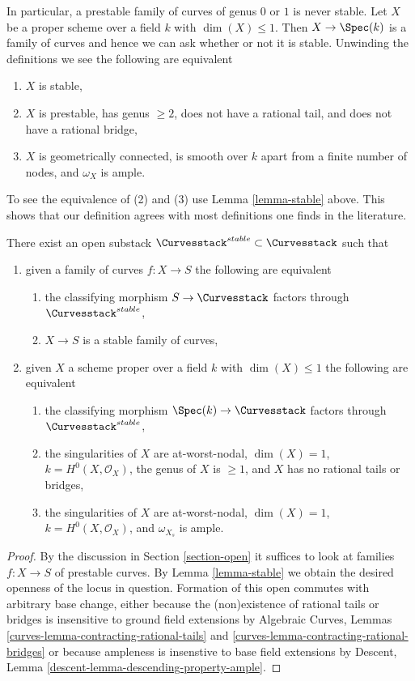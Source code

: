 \noindent
In particular, a prestable family of curves of genus $0$ or $1$ is never
stable.
Let $X$ be a proper scheme over a field $k$ with $\dim(X) \leq 1$.
Then $X \to \Spec(k)$ is a family of curves and hence we can ask
whether or not it is stable. Unwinding the definitions we see
the following are equivalent
\begin{enumerate}
\item $X$ is stable,
\item $X$ is prestable, has genus $\geq 2$, does not have a rational tail,
and does not have a rational bridge,
\item $X$ is geometrically connected, is smooth over $k$
apart from a finite number of nodes, and $\omega_X$ is ample.
\end{enumerate}
To see the equivalence of (2) and (3) use
Lemma \ref{lemma-stable} above.
This shows that our definition agrees with most definitions one finds
in the literature.

\begin{lemma}
\label{lemma-stable-curves}
There exist an open substack $\Curvesstack^{stable} \subset \Curvesstack$
such that
\begin{enumerate}
\item given a family of curves $f : X \to S$ the following are equivalent
\begin{enumerate}
\item the classifying morphism $S \to \Curvesstack$ factors
through $\Curvesstack^{stable}$,
\item $X \to S$ is a stable family of curves,
\end{enumerate}
\item given $X$ a scheme proper over a field $k$ with
$\dim(X) \leq 1$ the following are equivalent
\begin{enumerate}
\item the classifying morphism $\Spec(k) \to \Curvesstack$
factors through $\Curvesstack^{stable}$,
\item the singularities of $X$ are at-worst-nodal, $\dim(X) = 1$,
$k = H^0(X, \mathcal{O}_X)$, the genus of $X$ is $\geq 1$, and
$X$ has no rational tails or bridges,
\item the singularities of $X$ are at-worst-nodal, $\dim(X) = 1$,
$k = H^0(X, \mathcal{O}_X)$, and $\omega_{X_s}$ is ample.
\end{enumerate}
\end{enumerate}
\end{lemma}

\begin{proof}
By the discussion in Section \ref{section-open}
it suffices to look at families $f : X \to S$ of
prestable curves. By Lemma \ref{lemma-stable}
we obtain the desired openness of the locus in question.
Formation of this open commutes with arbitrary base change,
either because the (non)existence of rational tails or bridges
is insensitive to ground field extensions by
Algebraic Curves, Lemmas
\ref{curves-lemma-contracting-rational-tails} and
\ref{curves-lemma-contracting-rational-bridges}
or because ampleness is insenstive to base field extensions by
Descent, Lemma \ref{descent-lemma-descending-property-ample}.
\end{proof}

